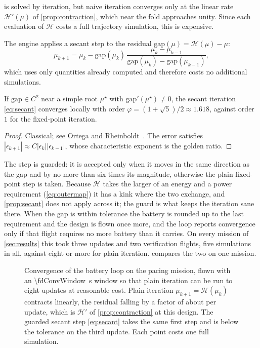  is solved by iteration, but naive iteration converges only
at the linear rate $\mathcal{H}'(\mu)$ of \cref{prop:contraction}, which near
the fold approaches unity. Since each evaluation of $\mathcal{H}$ costs a full
trajectory simulation, this is expensive.

The engine applies a secant step to the residual
$\mathrm{gap}(\mu) = \mathcal{H}(\mu)-\mu$:
\begin{equation}
  \mu_{k+1} = \mu_k - \mathrm{gap}(\mu_k)\,
    \frac{\mu_k-\mu_{k-1}}{\mathrm{gap}(\mu_k)-\mathrm{gap}(\mu_{k-1})} ,
  \label{eq:secant}
\end{equation}
which uses only quantities already computed and therefore costs no additional
simulations.

\begin{proposition}
\label{prop:secant}
If $\mathrm{gap}\in C^2$ near a simple root $\mu^\star$ with
$\mathrm{gap}'(\mu^\star)\ne0$, the secant iteration \cref{eq:secant} converges
locally with order $\varphi=(1+\sqrt5)/2\approx1.618$, against order $1$ for
the fixed-point iteration.
\end{proposition}

\begin{proof}
Classical; see Ortega and Rheinboldt~\cite[\S8.2]{ortega1970}. The error
satisfies $|\epsilon_{k+1}|\approx C|\epsilon_k||\epsilon_{k-1}|$, whose
characteristic exponent is the golden ratio.
\end{proof}

The step is guarded: it is accepted only when it moves in the same direction as
the gap and by no more than six times its magnitude, otherwise the plain
fixed-point step is taken. Because $\mathcal{H}$ takes the larger of an
energy and a power requirement (\cref{eq:outermap}) it has a kink where the
two exchange, and \cref{prop:secant} does not apply across it; the guard is
what keeps the iteration sane there. When the gap is within tolerance the
battery is rounded up to the last requirement and the design is flown once
more, and the loop reports convergence only if that flight requires no more
battery than it carries. On every mission of \cref{sec:results} this took
three updates and two verification flights, five simulations in all, against
eight or more for plain iteration.  compares the two on
one mission.

\begin{figure}[tbp]
\centering

\caption{Convergence of the battery loop on the pacing mission, flown with an
\SI{\fdConvWindow}{\second} window so that plain iteration can be run to eight
updates at reasonable cost. Plain iteration $\mu_{k+1}=\mathcal{H}(\mu_k)$
contracts linearly, the residual falling by a factor of about
\fdPlainRate{} per update, which is $\mathcal{H}'$ of \cref{prop:contraction}
at this design. The guarded secant step \cref{eq:secant} takes the same first
step and is below the tolerance on the third update. Each point costs one full
simulation.}
\label{fig:convergence}
\end{figure}

